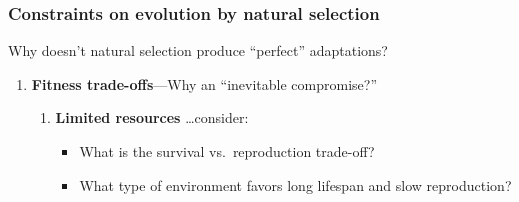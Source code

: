 \begin{noheadline}
\begin{frame}[t]
    \frametitle{Constraints on evolution by natural selection}
    \begin{adjustwidth}{-1.5em}{-1.5em}
        \vspace{-4mm}
        Why doesn't natural selection produce ``perfect'' adaptations?
        
        \begin{enumerate}
            \item \textbf{Fitness trade-offs}---Why an ``inevitable compromise?''
                
                \begin{enumerate}
                    \normalsize
                    \item \textbf{Limited resources} \ldots consider:
                        \begin{itemize}
                        \normalsize
                            \item What is the survival vs.\ reproduction
                                trade-off?
                                \vspace{6mm}
                            \item What type of environment favors long lifespan
                                and slow reproduction?
                        \end{itemize}
                \end{enumerate}
        \end{enumerate}
    \end{adjustwidth}
\end{frame}
\end{noheadline}

